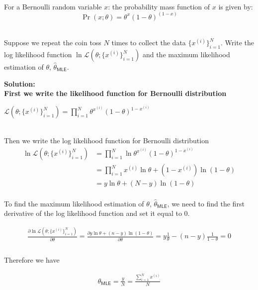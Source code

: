 \documentclass[11pt]{article}
\begin{document}
	\ \\
	For a Bernoulli random variable $x$: the probability mass function of
	$x$ is given by: $$\Pr( x; \theta) = \theta^x ( 1 - \theta)^{(1 - x)}$$
	
	\ \\
	Suppose we repeat the coin toss $N$ times
	to collect the data  $\{ x^{(i)}  \}_{i = 1}^N$. 
	Write the log likelihood function $\ln \mathcal{L}(\theta; \{ x^{(i)}\}_{i = 1}^N)$ and 
	the maximum likelihood estimation of $\theta$,  $\hat{\theta}_{\mathsf{MLE}}$.

{\noindent \bf Solution: 
\ \\
First we write the likelihood function for Bernoulli distribution

$ \mathcal{L}(\theta; \{ x^{(i)}\}_{i = 1}^N) = \prod\limits_{i=1}^{N} \theta^{x^{(i)}} (1-\theta)^{1-x^{(i)}}$


\ \\
Then we write the log likelihood function for Bernoulli distribution
\begin{equation}
    \begin{split}
         \ln \mathcal{L}(\theta; \{ x^{(i)}\}_{i = 1}^N) &= \prod\limits_{i=1}^{N} \ln\theta^{x^{(i)}} (1-\theta)^{1-x^{(i)}}\\
                                                         &= \prod\limits_{i=1}^{N} x^{(i)}\ln \theta + (1-x^{(i)})\ln(1-\theta) \\
                                                       & = y\ln \theta+(N-y)\ln(1-\theta)
    \end{split}
\end{equation}
\ \\
To find the maximum likelihood estimation of $\theta$,  $\hat{\theta}_{\mathsf{MLE}}$, we need to find the first derivative of the log likelihood function and set it equal to 0.

\begin{gather*}
    \frac{\partial\ln \mathcal{L}(\theta; \{ x^{(i)}\}_{i = 1}^N)}{\partial\theta} =   \frac{\partial y\ln \theta+(n-y)\ln(1-\theta)}{\partial\theta} = 
    y\frac{1}{\theta}-(n-y)\frac{1}{1-\theta} =0 \\
\end{gather*}
\ \\
Therefore we have

\begin{gather*}
      \hat{\theta}_{\mathsf{MLE}} = \frac{y}{N}=\frac{\sum_{i=1}^{N} x^{(i)}}{N} 
\end{gather*}
}
\end{document}
